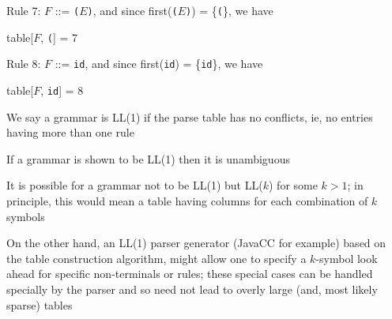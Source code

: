 \documentclass[8pt,a4paper,compress]{beamer}
\newcommand{\mm}[1]{$#1$}
\newenvironment{spaced}
{
\smallskip
\hspace{.5cm}
\begin{minipage}[c]{\textwidth}
}
{
\end{minipage}
\smallskip
}
\begin{document}
\begin{frame}[fragile]
\pause

Rule 7: $F$  ::= \lstinline{(}$E$\lstinline{)}, and since first(\lstinline{(}$E$\lstinline{)}) = \{\lstinline{(}\}, we have

\text{ }
\begin{spaced}
\begin{production}
table[\mm{F}, \lstinline{(}] = 7
\end{production}
\end{spaced}

\pause

Rule 8: $F$  ::= \lstinline{id}, and since first(\lstinline{id}) = \{\lstinline{id}\}, we have

\text{ }
\begin{spaced}
\begin{production}
table[\mm{F}, \lstinline{id}] = 8
\end{production}
\end{spaced}

\pause

We say a grammar is LL(1) if the parse table has no conflicts, ie, no entries having more than one rule

\pause
\bigskip

If a grammar is shown to be LL(1) then it is unambiguous

\pause
\bigskip

It is possible for a grammar not to be LL(1) but LL($k$) for some $k > 1$; in principle, this would mean a table having columns for each combination of $k$ symbols

\pause
\bigskip

On the other hand, an LL(1) parser generator (JavaCC for example) based on the table construction algorithm, might allow one to specify a $k$-symbol look ahead for specific non-terminals or rules; these special cases can be handled specially by the parser and so need not lead to overly large (and, most likely sparse) tables
\end{frame}
\end{document}

